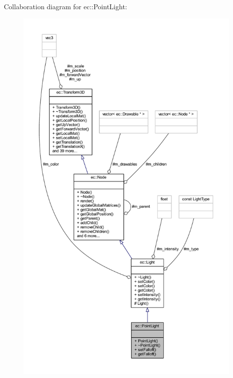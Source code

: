 Collaboration diagram for ec\+:\+:Point\+Light\+:\nopagebreak
\begin{figure}[H]
\begin{center}
\leavevmode
\includegraphics[height=550pt]{classec_1_1_point_light__coll__graph}
\end{center}
\end{figure}
